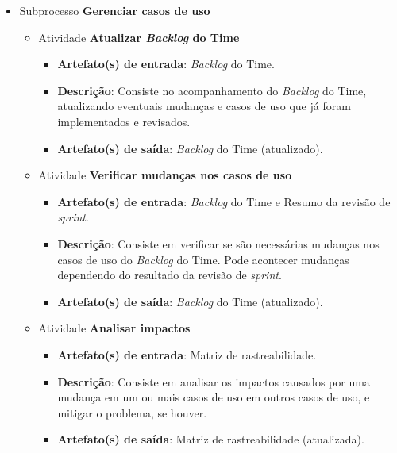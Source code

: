 \begin{itemize}
     \item Subprocesso \textbf{Gerenciar casos de uso}
     
	\begin{itemize}
	 
	 \item Atividade \textbf{Atualizar \textit{Backlog} do Time}
	    
	    \begin{itemize}
	      \item \textbf{Artefato(s) de entrada}: \textit{Backlog} do Time.

	      \item \textbf{Descrição}: Consiste no acompanhamento do \textit{Backlog} do Time, atualizando eventuais
		mudanças e casos de uso que já foram implementados e revisados.
	      
	      \item \textbf{Artefato(s) de saída}: \textit{Backlog} do Time (atualizado).
		    
	    \end{itemize}
	    
	 \item Atividade \textbf{Verificar mudanças nos casos de uso}
	    
	    \begin{itemize}
	      \item \textbf{Artefato(s) de entrada}: \textit{Backlog} do Time e Resumo da revisão de \textit{sprint}.

	      \item \textbf{Descrição}: Consiste em verificar se são necessárias mudanças nos casos de uso do \textit{Backlog}
		do Time. Pode acontecer mudanças dependendo do resultado da revisão de \textit{sprint}.
	      
	      \item \textbf{Artefato(s) de saída}: \textit{Backlog} do Time (atualizado).
		    
	    \end{itemize}
	    
	 \item Atividade \textbf{Analisar impactos}
	    
	    \begin{itemize}
	      \item \textbf{Artefato(s) de entrada}: Matriz de rastreabilidade.

	      \item \textbf{Descrição}: Consiste em analisar os impactos causados por uma mudança em um ou mais casos de uso
	       em outros casos de uso, e mitigar o problema, se houver.
	      
	      \item \textbf{Artefato(s) de saída}: Matriz de rastreabilidade (atualizada).
		    
	    \end{itemize}
	    
	\end{itemize}
	     
    \end{itemize}
    
    \vfill